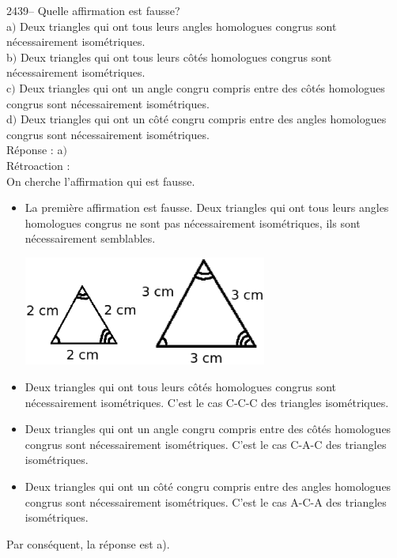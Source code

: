 \documentclass[letterpaper, 12pt]{article}
\begin{document}
2439-- Quelle affirmation est fausse?\\

a$)$ Deux triangles qui ont tous leurs angles homologues congrus sont n\'ecessairement isom\'etriques.\\
b$)$ Deux triangles qui ont tous leurs c\^ot\'es homologues congrus sont n\'ecessairement isom\'etriques.\\
c$)$ Deux triangles qui ont un angle congru compris entre des c\^ot\'es homologues congrus sont n\'ecessairement isom\'etriques.\\
d$)$ Deux triangles qui ont un c\^ot\'e congru compris entre des angles homologues congrus sont n\'ecessairement isom\'etriques. \\


R\'eponse : a$)$\\

R\'etroaction :\\
On cherche l'affirmation qui est fausse.\\
\begin{itemize}
 \item La premi\`ere affirmation est fausse. Deux triangles qui ont tous leurs angles homologues congrus ne sont pas n\'ecessairement isom\'etriques, ils sont n\'ecessairement semblables.
\begin{center}
 \includegraphics[width=8cm,bb=0 631 463 842]{Q2439.eps}
\end{center}
\item Deux triangles qui ont tous leurs c\^ot\'es homologues congrus sont n\'ecessairement isom\'etriques. C'est le cas C-C-C des triangles isom\'etriques.
\item Deux triangles qui ont un angle congru compris entre des c\^ot\'es homologues congrus sont n\'ecessairement isom\'etriques. C'est le cas C-A-C des triangles isom\'etriques.
\item Deux triangles qui ont un c\^ot\'e congru compris entre des angles homologues congrus sont n\'ecessairement isom\'etriques. C'est le cas A-C-A des triangles isom\'etriques.\\
\end{itemize}
Par cons\'equent, la r\'eponse est a).\\
\end{document}
